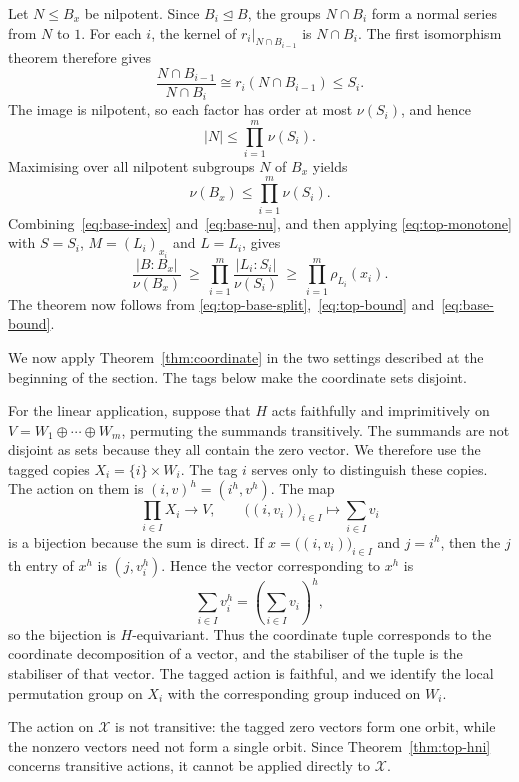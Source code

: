 \documentclass[10pt]{amsart}
\theoremstyle{definition}
\renewcommand{\leq}{\leqslant}
\renewcommand{\geq}{\geqslant}
\let\oldendproof\endproof
\renewenvironment{proof}[1][\proofname]{%
  \oldproof[\bfseries #1]%
}{\oldendproof}
\numberwithin{equation}{section}
\numberwithin{table}{section}
\begin{document}
\begin{proof}
Let $N\leq B_x$ be nilpotent. Since $B_i\trianglelefteq B$, the groups
$N\cap B_i$ form a normal series from $N$ to $1$.
For each $i$, the kernel of
$\left.r_i\right|_{N\cap B_{i-1}}$ is $N\cap B_i$. The first isomorphism
theorem therefore gives
$$
  \frac{N\cap B_{i-1}}{N\cap B_i}
  \cong r_i(N\cap B_{i-1})\leq S_i.
$$
The image is nilpotent, so each factor has order at most $\nu(S_i)$, and hence
$$
  |N|
  \leq\prod_{i=1}^m\nu(S_i).
$$
Maximising over all nilpotent subgroups $N$ of $B_x$ yields
\begin{equation}\label{eq:base-nu}
  \nu(B_x)\leq\prod_{i=1}^m\nu(S_i).
\end{equation}
Combining~\eqref{eq:base-index} and~\eqref{eq:base-nu}, and then applying
\eqref{eq:top-monotone} with
$S=S_i$, $M=(L_i)_{x_i}$ and $L=L_i$, gives
\begin{equation}\label{eq:base-bound}
  \frac{|B:B_x|}{\nu(B_x)}
  \ \geq\
  \prod_{i=1}^m\frac{|L_i:S_i|}{\nu(S_i)}
  \ \geq\
  \prod_{i=1}^m\rho_{L_i}(x_i).
\end{equation}
The theorem now follows from
\eqref{eq:top-base-split},~\eqref{eq:top-bound} and~\eqref{eq:base-bound}.
\end{proof}

We now apply Theorem~\ref{thm:coordinate} in the two settings described at
the beginning of the section. The tags below make the coordinate sets
disjoint.

For the linear application, suppose that $H$ acts faithfully and
imprimitively on $V=W_1\oplus\cdots\oplus W_m$, permuting the summands
transitively. The
summands are not disjoint as sets because they all contain the zero vector.
We therefore use the tagged copies $X_i=\{i\}\times W_i$. The tag $i$ serves
only to distinguish these copies. The action on them is
$(i,v)^h=(i^h,v^h)$.
The map
$$
  \prod_{i\in I}X_i\longrightarrow V,
  \qquad
  \bigl((i,v_i)\bigr)_{i\in I}\longmapsto
  \sum_{i\in I}v_i
$$
is a bijection because the sum is direct. If
$x=\bigl((i,v_i)\bigr)_{i\in I}$ and $j=i^h$, then the $j$th entry of $x^h$
is $(j,v_i^h)$. Hence the vector corresponding to $x^h$ is
$$
  \sum_{i\in I}v_i^h=\left(\sum_{i\in I}v_i\right)^h,
$$
so the bijection is $H$-equivariant. Thus the coordinate tuple corresponds to the
coordinate decomposition of a vector, and the stabiliser of the tuple is the
stabiliser of that vector. The tagged action is faithful, and we identify the
local permutation group on $X_i$ with the corresponding group induced on
$W_i$.

The action on $\mathcal X$ is not transitive: the tagged zero vectors form
one orbit, while the nonzero vectors need not form a single orbit. Since
Theorem~\ref{thm:top-hni} concerns transitive actions, it cannot be applied
directly to $\mathcal X$.
\end{document}
